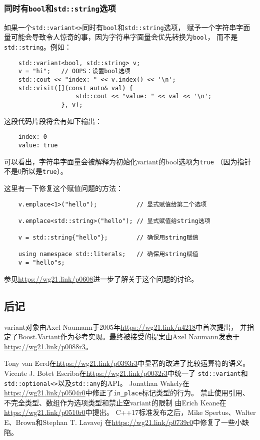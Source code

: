 \subsubsection{同时有\texttt{bool}和\texttt{std::string}选项}
如果一个\texttt{std::variant<>}同时有\texttt{bool}和\texttt{std::string}选项，
赋予一个字符串字面量可能会导致令人惊奇的事，因为字符串字面量会优先转换为\texttt{bool}，
而不是\texttt{std::string}。例如：
\begin{lstlisting}
    std::variant<bool, std::string> v;
    v = "hi";   // OOPS：设置bool选项
    std::cout << "index: " << v.index() << '\n';
    std::visit([](const auto& val) {
                    std::cout << "value: " << val << '\n';
                }, v);
\end{lstlisting}
这段代码片段将会有如下输出：
\begin{lstlisting}
    index: 0
    value: true
\end{lstlisting}
可以看出，字符串字面量会被解释为初始化variant的bool选项为\texttt{true}
（因为指针不是0所以是\texttt{true}）。

这里有一下修复这个赋值问题的方法：
\begin{lstlisting}
    v.emplace<1>("hello");           // 显式赋值给第二个选项

    v.emplace<std::string>("hello"); // 显式赋值给string选项

    v = std::string{"hello"};        // 确保用string赋值

    using namespace std::literals;   // 确保用string赋值
    v = "hello"s;
\end{lstlisting}
参见\url{https://wg21.link/p0608}进一步了解关于这个问题的讨论。

\subsection{后记}
variant对象由Axel Naumann于2005年\url{https://wg21.link/n4218}中首次提出，
并指定了Boost.Variant作为参考实现。最终被接受的提案由Axel Naumann发表于
\url{https://wg21.link/p0088r3}。

Tony van Eerd在\url{https://wg21.link/p0393r3}中显著的改进了比较运算符的语义。
Vicente J. Botet Escriba在\url{https://wg21.link/p0032r3}中统一了
\texttt{std::variant}和\texttt{std::optional<>}以及\texttt{std::any}的API。
Jonathan Wakely在\url{https://wg21.link/p0504r0}中修正了\texttt{in\_place}标记类型的行为。
禁止使用引用、不完全类型、数组作为选项类型和禁止空variant的限制
由Erich Keane在\url{https://wg21.link/p0510r0}中提出。
C++17标准发布之后，Mike Spertus、Walter E、Brown和Stephan T. Lavavej
在\url{https://wg21.link/p0739r0}中修复了一些小缺陷。

\setcounter{footnote}{0}